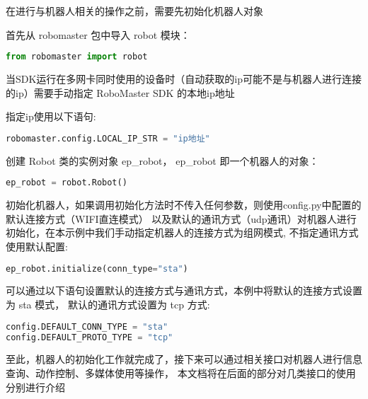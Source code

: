 

\begin{issues}
\issueDraft
\end{issues}

在进行与机器人相关的操作之前，需要先初始化机器人对象

首先从 robomaster 包中导入 robot 模块：

\begin{lstlisting}[language=python]
from robomaster import robot
\end{lstlisting}

当SDK运行在多网卡同时使用的设备时（自动获取的ip可能不是与机器人进行连接的ip）需要手动指定 RoboMaster SDK 的本地ip地址

指定ip使用以下语句:

\begin{lstlisting}[language=python]
robomaster.config.LOCAL_IP_STR = "ip地址"
\end{lstlisting}

创建 Robot 类的实例对象 ep_robot， ep_robot 即一个机器人的对象：

\begin{lstlisting}[language=python]
ep_robot = robot.Robot()
\end{lstlisting}

初始化机器人，如果调用初始化方法时不传入任何参数，则使用config.py中配置的默认连接方式（WIFI直连模式） 以及默认的通讯方式（udp通讯）对机器人进行初始化，在本示例中我们手动指定机器人的连接方式为组网模式, 不指定通讯方式使用默认配置:

\begin{lstlisting}[language=python]
ep_robot.initialize(conn_type="sta")
\end{lstlisting}

可以通过以下语句设置默认的连接方式与通讯方式，本例中将默认的连接方式设置为 sta 模式， 默认的通讯方式设置为 tcp 方式:

\begin{lstlisting}[language=python]
config.DEFAULT_CONN_TYPE = "sta"
config.DEFAULT_PROTO_TYPE = "tcp"
\end{lstlisting}

至此，机器人的初始化工作就完成了，接下来可以通过相关接口对机器人进行信息查询、动作控制、多媒体使用等操作， 本文档将在后面的部分对几类接口的使用分别进行介绍
